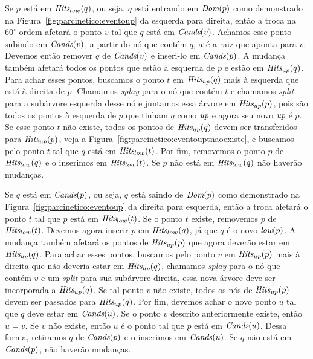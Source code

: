 Se $p$ está em $\textit{Hits}_{low}(q)$, ou seja, $q$ está entrando em $\textit{Dom}(p)$ como demonstrado na
Figura~\ref{fig:parcinetico:eventoup} da esquerda para direita, então a troca na $60^\circ$-ordem
afetará o ponto $v$ tal que $q$ está em $\textit{Cands}(v)$.
Achamos esse ponto subindo em $\textit{Cands}(v)$, a partir do nó que contém $q$, até a raiz que aponta
para $v$.
Devemos então remover $q$ de $\textit{Cands}(v)$ e inseri-lo em $\textit{Cands}(p)$.
A mudança também afetará todos os pontos que estão à esquerda de $p$ e estão em $\textit{Hits}_{up}(q)$.
Para achar esses pontos, buscamos o ponto $t$ em $\textit{Hits}_{up}(q)$ mais à esquerda que está à
direita de $p$.
Chamamos \textit{splay} para o nó que contém $t$ e chamamos \textit{split} para a subárvore
esquerda desse nó e juntamos essa árvore em $\textit{Hits}_{up}(p)$, pois são todos os pontos à esquerda
de $p$ que tinham $q$ como $\textit{up}$ e agora seu novo $\textit{up}$ é $p$.
Se esse ponto $t$ não existe, todos os pontos de $\textit{Hits}_{up}(q)$ devem ser transferidos para
$\textit{Hits}_{up}(p)$, veja a Figura~\ref{fig:parcinetico:eventouptnaoexiste}, e buscamos pelo ponto $t$
tal que $q$ está em $\textit{Hits}_{low}(t)$.
Por fim, removemos o ponto $p$ de $\textit{Hits}_{low}(q)$ e o inserimos em $\textit{Hits}_{low}(t)$.
Se $p$ não está em $\textit{Hits}_{low}(q)$ não haverão mudanças.

Se $q$ está em $\textit{Cands}(p)$, ou seja, $q$ está saindo de $\textit{Dom}(p)$ como demonstrado na
Figura~\ref{fig:parcinetico:eventoup} da direita para esquerda, então a troca afetará o ponto $t$
tal que $p$ está em $\textit{Hits}_{low}(t)$.
Se o ponto $t$ existe, removemos $p$ de $\textit{Hits}_{low}(t)$.
Devemos agora inserir $p$ em $\textit{Hits}_{low}(q)$, já que $q$ é o novo $\textit{low}(p)$.
A mudança também afetará os pontos de $\textit{Hits}_{up}(p)$ que agora deverão estar em $\textit{Hits}_{up}(q)$.
Para achar esses pontos, buscamos pelo ponto $v$ em $\textit{Hits}_{up}(p)$ mais à direita que não deveria
estar em $\textit{Hits}_{up}(q)$, chamamos \textit{splay} para o nó que contém $v$ e um \textit{split}
para sua subárvore direita, essa nova árvore deve ser incorporada a $\textit{Hits}_{up}(q)$.
Se tal ponto $v$ não existe, todos os nós de $\textit{Hits}_{up}(p)$ devem ser passados para $\textit{Hits}_{up}
(q)$.
Por fim, devemos achar o novo ponto $u$ tal que $q$ deve estar em $\textit{Cands}(u)$.
Se o ponto $v$ descrito anteriormente existe, então $u = v$.
Se $v$ não existe, então $u$ é o ponto tal que $p$ está em $\textit{Cands}(u)$.
Dessa forma, retiramos $q$ de $\textit{Cands}(p)$ e o inserimos em $\textit{Cands}(u)$.
Se $q$ não está em $\textit{Cands}(p)$, não haverão mudanças.



